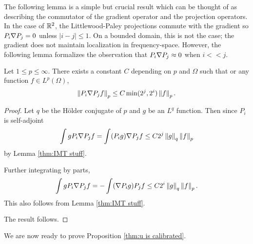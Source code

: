 The following lemma is a simple but crucial result which can be thought of as describing the commutator of the gradient operator and the projection operators.  In the case of $\mathbb{R}^2$, the Littlewood-Paley projections commute with the gradient so $P_i \nabla P_j = 0$ unless $|i-j|\leq 1$.  On a bounded domain, this is not the case; the gradient does not maintain localization in frequency-space.  However, the following lemma formalizes the observation that $P_i \nabla P_j \approx 0$ when $i << j$.  

\begin{lemma} \label{thm:grad and proj}
Let $1 \leq p \leq \infty$.  There exists a constant $C$ depending on $p$ and $\Omega$ such that or any function $f \in L^p(\Omega)$,
\[ \left\lVert P_i \nabla P_j f\right\rVert_p \leq C \min(2^j,2^i) \left\lVert f\right\rVert_p. \]
\end{lemma}
\begin{proof}
Let $q$ be the H\"{o}lder conjugate of $p$ and $g$ be an $L^q$ function.  Then since $P_i$ is self-adjoint
\[ \int g P_i \nabla P_j f = \int (P_i g) \nabla P_j f \leq C 2^j \left\lVert g\right\rVert_q \left\lVert f\right\rVert_p \]
by Lemma \ref{thm:IMT stuff}.  

Further integrating by parts,
\[ \int g P_i \nabla P_j f = - \int (\nabla P_i g) P_j f \leq C 2^i \left\lVert g\right\rVert_q \left\lVert f\right\rVert_p. \]
This also follows from Lemma \ref{thm:IMT stuff}.  

The result follows.  
\end{proof}

We are now ready to prove Proposition \ref{thm:u is calibrated}.  

